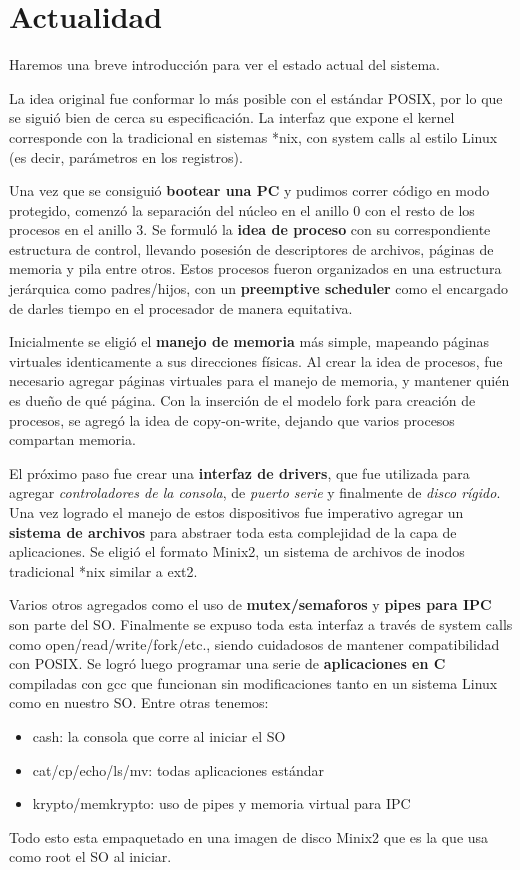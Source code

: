 \section{Actualidad}

Haremos una breve introducción para ver el estado actual del sistema.

La idea original fue conformar lo más posible con el estándar POSIX, por lo que se
siguió bien de cerca su especificación. La interfaz que expone el kernel
corresponde con la tradicional en sistemas *nix, con system calls al estilo
Linux (es decir, parámetros en los registros).

Una vez que se consiguió \textbf{bootear una PC} y pudimos correr código en modo
protegido, comenzó la separación del núcleo en el anillo 0 con el resto de los
procesos en el anillo 3. Se formuló la \textbf{idea de proceso} con su correspondiente
estructura de control, llevando posesión de descriptores de archivos, páginas de
memoria y pila entre otros. Estos procesos fueron organizados en una estructura
jerárquica como padres/hijos, con un \textbf{preemptive scheduler} como el encargado de
darles tiempo en el procesador de manera equitativa.

Inicialmente se eligió el \textbf{manejo de memoria} más simple, mapeando páginas
virtuales identicamente a sus direcciones físicas. Al crear la idea de procesos,
fue necesario agregar páginas virtuales para el manejo de memoria, y mantener
quién es dueño de qué página. Con la inserción de el modelo fork para creación
de procesos, se agregó la idea de copy-on-write, dejando que varios procesos
compartan memoria.

El próximo paso fue crear una \textbf{interfaz de drivers}, que fue utilizada para agregar
\textit{controladores de la consola}, de \textit{puerto serie} y finalmente de
\textit{disco rígido}. Una vez logrado el manejo de estos
dispositivos fue imperativo agregar un \textbf{sistema de archivos} para abstraer toda
esta complejidad de la capa de aplicaciones. Se eligió el formato Minix2, un
sistema de archivos de inodos tradicional *nix similar a ext2.

Varios otros agregados como el uso de \textbf{mutex/semaforos} y \textbf{pipes
para IPC} son parte del SO. Finalmente se expuso toda esta interfaz a través
de system calls como open/read/write/fork/etc., siendo cuidadosos de mantener
compatibilidad con POSIX. Se logró luego programar una serie de
\textbf{aplicaciones en C} compiladas con gcc que funcionan sin modificaciones
tanto en un sistema Linux como en nuestro SO. Entre otras tenemos:

\begin{itemize}
  \item cash: la consola que corre al iniciar el SO
  \item cat/cp/echo/ls/mv: todas aplicaciones estándar
  \item krypto/memkrypto: uso de pipes y memoria virtual para IPC
\end{itemize}

Todo esto esta empaquetado en una imagen de disco Minix2 que es la que usa como
root el SO al iniciar.
